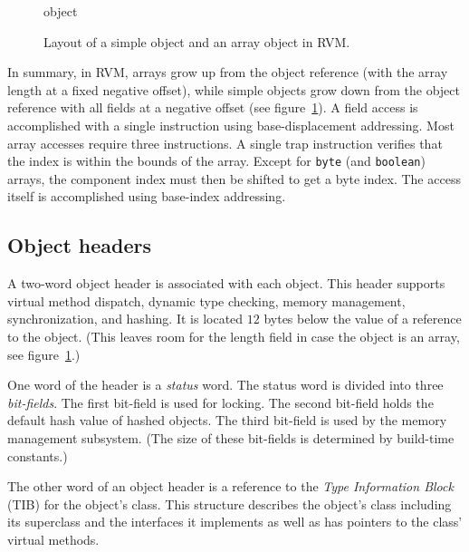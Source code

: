\begin{figure}[htb]
\begin{gif}{object}
\vbox{
\hbox{}
}\hfil
\end{gif}
\caption{Layout of a simple object and an array object in RVM.}
\label{fig:objects}
\end{figure}

In summary, in RVM, arrays grow up from the object reference (with the
array length at a fixed negative offset), while simple objects grow
down from the object reference with all fields at a negative offset
(see figure~\ref{fig:objects}).  A field access is accomplished with a
single instruction using base-displacement addressing.  Most array
accesses require three instructions.  A single trap instruction
verifies that the index is within the bounds of the array.  Except for
{\tt byte} (and {\tt boolean}) arrays, the component index must then
be shifted to get a byte index.  The access itself is accomplished
using base-index addressing.

\JavaTMFooter

\subsection{Object headers} \label{sssec:headers}
A two-word object header is associated with each object.  This header
supports virtual method dispatch, dynamic type checking, memory
management, synchronization, and hashing.  It is located $12$ bytes
below the value of a reference to the object.  (This leaves room for
the length field in case the object is an array, see
figure~\ref{fig:objects}.)

One word of the header is a {\em status} word.  The status word is
divided into three {\em bit-fields}.  The first bit-field is used for
locking.  The second bit-field holds
the default hash value of hashed objects.  The third bit-field is used
by the memory management subsystem.  (The size of these bit-fields is
determined by build-time constants.)

The other word of an object header is a reference to the {\em Type
Information Block} (TIB) for the object's class. This structure describes
the object's class including its superclass and the interfaces it implements
as well as has pointers to the class' virtual methods.

